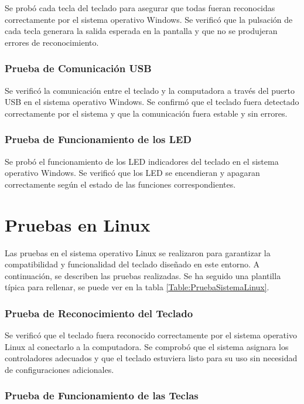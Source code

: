 Se probó cada tecla del teclado para asegurar que todas fueran reconocidas correctamente por el sistema operativo \gls{Windows}. Se verificó que la pulsación de cada tecla generara la salida esperada en la pantalla y que no se produjeran errores de reconocimiento.

\subsubsection{Prueba de Comunicación USB}

Se verificó la comunicación entre el teclado y la computadora a través del puerto \gls{USB} en el sistema operativo \gls{Windows}. Se confirmó que el teclado fuera detectado correctamente por el sistema y que la comunicación fuera estable y sin errores.

\subsubsection{Prueba de Funcionamiento de los \gls{LED}}

Se probó el funcionamiento de los \gls{LED} indicadores del teclado en el sistema operativo \gls{Windows}. Se verificó que los \gls{LED} se encendieran y apagaran correctamente según el estado de las funciones correspondientes.

\section{Pruebas en \gls{Linux}}

Las pruebas en el sistema operativo \gls{Linux} se realizaron para garantizar la compatibilidad y funcionalidad del teclado diseñado en este entorno. A continuación, se describen las pruebas realizadas. Se ha seguido una plantilla típica para rellenar, se puede ver en la tabla \ref{Table:PruebaSistemaLinux}.

\subsubsection{Prueba de Reconocimiento del Teclado}

Se verificó que el teclado fuera reconocido correctamente por el sistema operativo \gls{Linux} al conectarlo a la computadora. Se comprobó que el sistema asignara los controladores adecuados y que el teclado estuviera listo para su uso sin necesidad de configuraciones adicionales.

\subsubsection{Prueba de Funcionamiento de las Teclas}

